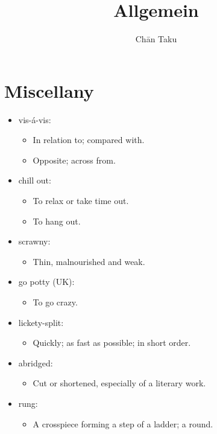 \documentclass{article}
\title{Allgemein}
\author{Ch\=an Taku}
\begin{document}
\maketitle

\section{Miscellany}

\begin{itemize}
    \item vis-\'a-vis:
    \begin{itemize}
        \item In relation to; compared with.
        \item Opposite; across from.
    \end{itemize}
    \item chill out:
    \begin{itemize}
        \item To relax or take time out.
        \item To hang out.
    \end{itemize}
    \item scrawny:
    \begin{itemize}
        \item Thin, malnourished and weak.
    \end{itemize}
    \item go potty (UK):
    \begin{itemize}
        \item To go crazy.
    \end{itemize}
    \item lickety-split:
    \begin{itemize}
        \item Quickly; as fast as possible; in short order.
    \end{itemize}
    \item abridged:
    \begin{itemize}
        \item Cut or shortened, especially of a literary work.
    \end{itemize}
    \item rung:
    \begin{itemize}
        \item A crosspiece forming a step of a ladder; a round.
    \end{itemize}
\end{itemize}

% 
% 
\end{document}
